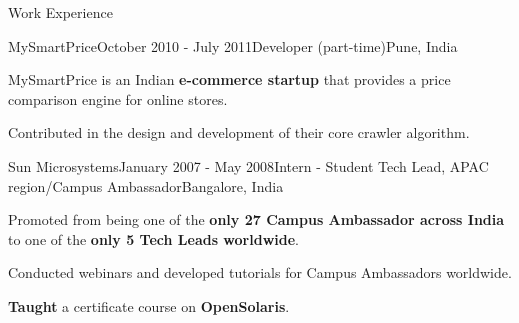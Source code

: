 \documentclass{resume} %
\begin{document}
\begin{rSection}{Work Experience}
\begin{rSubsection}{MySmartPrice}{October 2010 - July 2011}{Developer
(part-time)}{Pune, India} 
\item MySmartPrice is an Indian \textbf{e-commerce startup} that provides a
price comparison engine for online stores. 
\begin{lsubSubsection}
\item Contributed in the design and development of their core crawler algorithm. 
\end{lsubSubsection}
\end{rSubsection}

\begin{rSubsection}{Sun Microsystems}{January 2007 - May 2008}{Intern - Student
Tech Lead, APAC region/Campus Ambassador}{Bangalore, India}
\item Promoted from being one of the \textbf{only 27 Campus Ambassador across India}
to one of the \textbf{only 5 Tech Leads worldwide}.  
\begin{lsubSubsection}
\item Conducted webinars and developed tutorials for Campus Ambassadors
worldwide.
\item \textbf{Taught} a certificate course on \textbf{OpenSolaris}.
\end{lsubSubsection}
\end{rSubsection}
\end{rSection}
\end{document}
